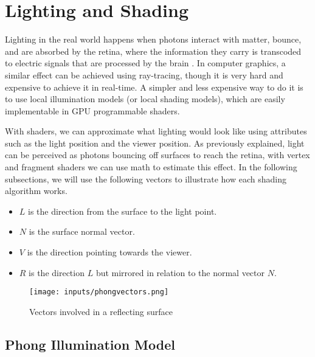 \documentclass[cic,tc,english]{iiufrgs}
\begin{document}

\section{Lighting and Shading}
\label{lightingshadingsection}
Lighting in the real world happens when photons interact with matter, bounce, and are absorbed by the retina, where the information they carry is transcoded to electric signals that are processed by the brain \cite{Marschner2021CGFundamentals}. In computer graphics, a similar effect can be achieved using ray-tracing, though it is very hard and expensive to achieve it in real-time. A simpler and less expensive way to do it is to use local illumination models (or local shading models), which are easily implementable in GPU programmable shaders.

With shaders, we can approximate what lighting would look like using attributes such as the light position and the viewer position. As previously explained, light can be perceived as photons bouncing off surfaces to reach the retina, with vertex and fragment shaders we can use math to estimate this effect. In the following subsections, we will use the following vectors to illustrate how each shading algorithm works.

\begin{itemize}
    \item $L$ is the direction from the surface to the light point.
    \item $N$ is the surface normal vector.
    \item $V$ is the direction pointing towards the viewer.
    \item $R$ is the direction $L$ but mirrored in relation to the normal vector $N$.
\end{itemize}

\begin{figure}[hbt!]
    \caption{Vectors involved in a reflecting surface}
    \begin{center}
        \texttt{[image: inputs/phongvectors.png]}
    \end{center}
    \label{phongvectors}
\end{figure}

\subsection{Phong Illumination Model}
\end{document}
